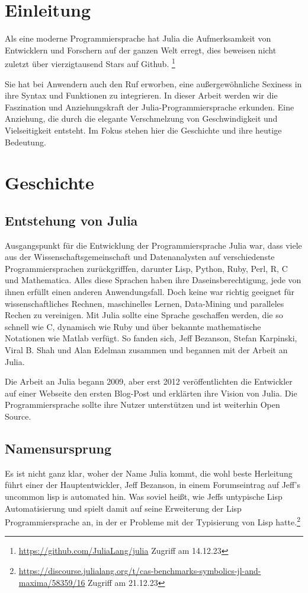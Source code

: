 \section{Einleitung}
 Als eine moderne Programmiersprache hat Julia die Aufmerksamkeit von Entwicklern und Forschern auf der ganzen Welt erregt, dies beweisen nicht zuletzt über vierzigtausend Stars auf Github.
 \footnote{\url{https://github.com/JuliaLang/julia} Zugriff am 14.12.23} 
 
 Sie hat bei Anwendern auch den Ruf erworben, eine außergewöhnliche \glqq Sexiness\grqq{} in ihre Syntax und Funktionen zu integrieren. In dieser Arbeit werden wir die Faszination und Anziehungskraft der Julia-Programmiersprache erkunden. Eine Anziehung, die durch die elegante Verschmelzung von Geschwindigkeit und Vielseitigkeit entsteht. Im Fokus stehen hier die Geschichte und ihre heutige Bedeutung.


\section{Geschichte}
\subsection{Entstehung von Julia}
Ausgangspunkt für die Entwicklung der Programmiersprache Julia war, dass viele aus der Wissenschaftsgemeinschaft und Datenanalysten auf verschiedenste Programmiersprachen zurückgrifffen, darunter Lisp, Python, Ruby, Perl, R, C und Mathematica.
Alles diese Sprachen haben ihre Daseinsberechtigung, jede von ihnen erfüllt einen anderen Anwendungsfall. Doch keine war richtig geeignet für wissenschaftliches Rechnen, maschinelles Lernen, Data-Mining und paralleles Rechen zu vereinigen. Mit Julia sollte eine Sprache geschaffen werden, die so schnell wie C, dynamisch wie Ruby und über bekannte mathematische Notationen wie Matlab verfügt. So fanden sich, Jeff Bezanson, Stefan Karpinski, Viral B. Shah und Alan Edelman zusammen und begannen mit der Arbeit an Julia.

Die Arbeit an Julia begann 2009, aber erst 2012 veröffentlichten die Entwickler auf einer Webseite den ersten Blog-Post und erklärten ihre Vision von Julia. 
Die Programmiersprache sollte ihre Nutzer unterstützen und ist weiterhin Open Source.
\cite{Bezanson_Julia_A_fresh_2017}

\subsection{Namensursprung}
Es ist nicht ganz klar, woher der Name Julia kommt, die wohl beste Herleitung führt
einer der Hauptentwickler, Jeff Bezanson, in einem Forumseintrag auf Jeff’s uncommon lisp is automated hin.
Was soviel heißt, wie Jeffs untypische Lisp Automatisierung und spielt damit auf seine Erweiterung der Lisp Programmiersprache an, in der er Probleme mit der Typisierung von Lisp hatte.\footnote{\url{https://discourse.julialang.org/t/cas-benchmarks-symbolics-jl-and-maxima/58359/16} Zugriff am 21.12.23}

